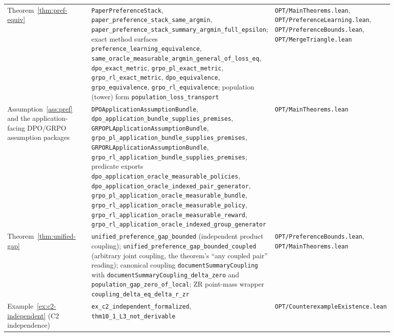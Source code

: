 {\begin{longtable}{p{0.28\linewidth}p{0.34\linewidth}p{0.30\linewidth}}
Theorem~\ref{thm:pref-equiv} &
\texttt{PaperPreferenceStack}, \texttt{paper\_preference\_stack\_same\_argmin}, \texttt{paper\_preference\_stack\_summary\_argmin\_full\_epsilon}; exact method surfaces \texttt{preference\_learning\_equivalence}, \texttt{same\_oracle\_measurable\_argmin\_general\_of\_loss\_eq}, \texttt{dpo\_exact\_metric}, \texttt{grpo\_pl\_exact\_metric}, \texttt{grpo\_rl\_exact\_metric}, \texttt{dpo\_equivalence}, \texttt{grpo\_equivalence}, \texttt{grpo\_rl\_equivalence}; population (tower) form \texttt{population\_loss\_transport} &
\texttt{OPT/MainTheorems.lean}, \texttt{OPT/PreferenceLearning.lean}, \texttt{OPT/PreferenceBounds.lean}, \texttt{OPT/MergeTriangle.lean} \\

Assumption~\ref{ass:pref} and the application-facing DPO/GRPO assumption packages &
\texttt{DPOApplicationAssumptionBundle}, \texttt{dpo\_application\_bundle\_supplies\_premises}, \texttt{GRPOPLApplicationAssumptionBundle}, \texttt{grpo\_pl\_application\_bundle\_supplies\_premises}, \texttt{GRPORLApplicationAssumptionBundle}, \texttt{grpo\_rl\_application\_bundle\_supplies\_premises}; predicate exports \texttt{dpo\_application\_oracle\_measurable\_policies}, \texttt{dpo\_application\_oracle\_indexed\_pair\_generator}, \texttt{grpo\_pl\_application\_oracle\_measurable\_bundle}, \texttt{grpo\_rl\_application\_oracle\_measurable\_policy}, \texttt{grpo\_rl\_application\_oracle\_measurable\_reward}, \texttt{grpo\_rl\_application\_oracle\_indexed\_group\_generator} &
\texttt{OPT/MainTheorems.lean} \\

Theorem~\ref{thm:unified-gap} &
\texttt{unified\_preference\_gap\_bounded} (independent product coupling);
\texttt{unified\_preference\_gap\_bounded\_coupled} (arbitrary joint coupling,
the theorem's ``any coupled pair'' reading); canonical coupling
\texttt{documentSummaryCoupling} with
\texttt{documentSummaryCoupling\_delta\_zero} and
\texttt{population\_gap\_zero\_of\_local}; ZR point-mass wrapper
\texttt{coupling\_delta\_eq\_delta\_r\_zr} &
\texttt{OPT/PreferenceBounds.lean}, \texttt{OPT/MainTheorems.lean} \\

Example~\ref{ex:c2-independent} (C2 independence) &
\texttt{ex\_c2\_independent\_formalized}, \texttt{thm10\_1\_L3\_not\_derivable} &
\texttt{OPT/CounterexampleExistence.lean} \\


\end{longtable}}
